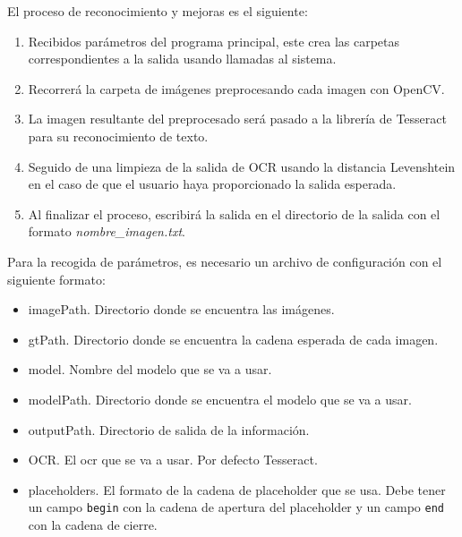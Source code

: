 El proceso de reconocimiento y mejoras es el siguiente:
\begin{enumerate}
	\item  Recibidos parámetros del programa principal, este crea las carpetas correspondientes a la salida usando llamadas al sistema.
	\item Recorrerá la carpeta de imágenes preprocesando cada imagen con OpenCV.
	\item La imagen resultante del preprocesado será pasado a la librería de Tesseract para su reconocimiento de texto.
	\item Seguido de una limpieza de la salida de OCR usando la distancia Levenshtein en el caso de que el usuario haya proporcionado la salida esperada.
	\item  Al finalizar el proceso, escribirá la salida en el directorio de la salida con el formato \emph{nombre\_imagen.txt}.
\end{enumerate}
 
Para la recogida de parámetros, es necesario un archivo de configuración con el siguiente formato:
\begin{itemize}
	\item imagePath. Directorio donde se encuentra las imágenes.
	\item gtPath. Directorio donde se encuentra la cadena esperada de cada imagen.
   	\item model. Nombre del modelo que se va a usar.
	\item modelPath. Directorio donde se encuentra el modelo que se va a usar.
	\item outputPath. Directorio de salida de la información.
	\item OCR. El ocr que se va a usar. Por defecto Tesseract.
	\item placeholders. El formato de la cadena de placeholder que se usa. Debe tener un campo \texttt{begin} con la cadena de apertura del placeholder y un campo \texttt{end} con la cadena de cierre.
\end{itemize}


